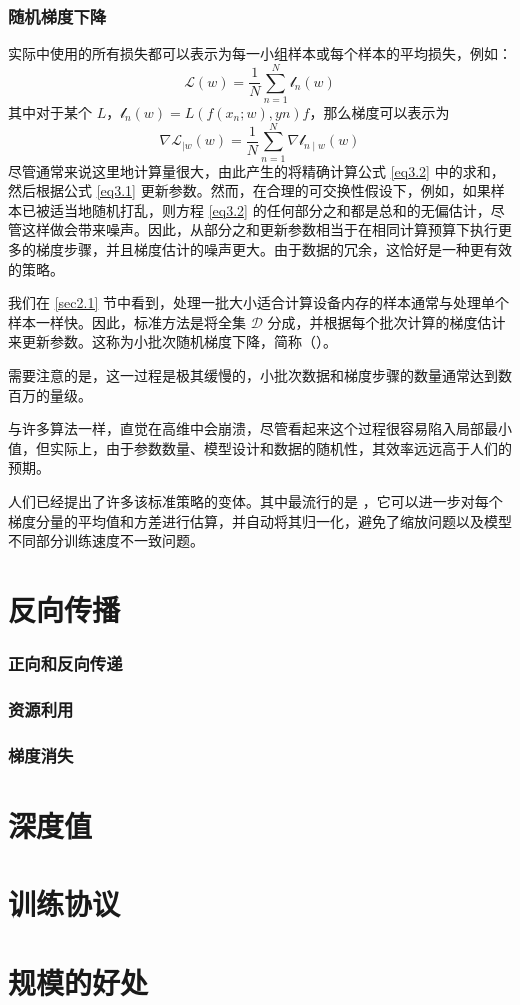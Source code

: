 \subsubsection*{随机梯度下降}

实际中使用的所有损失都可以表示为每一小组样本或每个样本的平均损失，例如：
\[\mathcal{L}(w) = \frac{1}{N} \sum_{n=1}^{N} \mathcal{l}_n(w)\]
其中对于某个 $L$，$\mathcal{l}_n(w) = L(f(x_n;w),yn) f$，那么梯度可以表示为
\begin{equation}
    \nabla \mathcal{L}_{\mid w}(w) = \frac{1}{N} \sum_{n=1}^{N} \nabla \mathcal{l}_{n \mid w}(w)\label{eq3.2}
\end{equation}
尽管通常来说这里地计算量很大，由此产生的将精确计算公式 \ref{eq3.2} 中的求和，然后根据公式 \ref{eq3.1} 更新参数。然而，在合理的可交换性假设下，例如，如果样本已被适当地随机打乱，则方程 \ref{eq3.2} 的任何部分之和都是总和的无偏估计，尽管这样做会带来噪声。因此，从部分之和更新参数相当于在相同计算预算下执行更多的梯度步骤，并且梯度估计的噪声更大。由于数据的冗余，这恰好是一种更有效的策略。

我们在 \ref{sec2.1} 节中看到，处理一批大小适合计算设备内存的样本通常与处理单个样本一样快。因此，标准方法是将全集 $\mathcal{D}$ 分成，并根据每个批次计算的梯度估计来更新参数。这称为小批次随机梯度下降，简称（）。

需要注意的是，这一过程是极其缓慢的，小批次数据和梯度步骤的数量通常达到数百万的量级。

与许多算法一样，直觉在高维中会崩溃，尽管看起来这个过程很容易陷入局部最小值，但实际上，由于参数数量、模型设计和数据的随机性，其效率远远高于人们的预期。

人们已经提出了许多该标准策略的变体。其中最流行的是 \citep{arxiv-1412.6980}，它可以进一步对每个梯度分量的平均值和方差进行估算，并自动将其归一化，避免了缩放问题以及模型不同部分训练速度不一致问题。

\section{反向传播}

\subsubsection*{正向和反向传递}

\subsubsection*{资源利用}

\subsubsection*{梯度消失}

\section{深度值}\label{sec3.6}

\section{训练协议}\label{sec3.7}

\section{规模的好处}